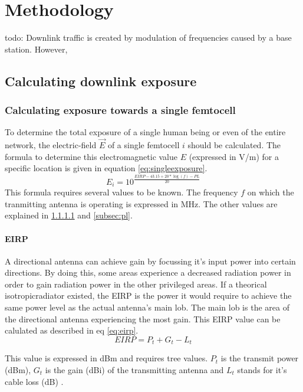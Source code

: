 \chapter{Methodology}
\label{chap:deploymenttool}
todo: Downlink traffic is created by modulation of frequencies caused by a base station. However, 
 
\section{Calculating downlink exposure}
\subsection{Calculating exposure towards a single femtocell}
\label{sec:calculatingexposure}
To determine the total exposure of a single human being or even of the entire network, the electric-field $\vec{E}$ of a single femtocell $i$ should be calculated.
The formula to determine this electromagnetic value $E$ (expressed in V/m) for a specific location is given in equation \ref{eq:singleexposure}.
\begin{equation}
E_i = 10^{\frac{EIRP - 43.15 + 20*\log(f)- PL}{20}}
\label{eq:singleexposure}
\end{equation}
This formula requires several values to be known. The frequency $f$ on which the tranmitting antenna is operating is expressed in MHz. The other values are explained in \ref{subsec:eirp} and \ref{subsec:pl}.

\subsubsection{EIRP}
\label{subsec:eirp}
A directional antenna can achieve gain by focussing it's input power into certain directions. By doing this, some areas experience a decreased radiation power in order to gain radiation power 
in the other privileged areas. If a theorical \gls{isotropicradiator} existed, the \gls{EIRP} is the power it would require to achieve the same power level as the actual antenna's main lob. The main lob is the area of the directional antenna experiencing the most gain.
This \gls{EIRP} value can be calulated as described in eq \ref{eq:eirp}.
\begin{equation}
EIRP = P_t + G_t - L_t
\label{eq:eirp}
\end{equation}

This value is expressed in dBm and requires tree values. $P_t$ is the transmit power (dBm), $G_t$ is the gain (dBi) of the transmitting antenna and $L_t$ stands for it's cable loss (dB) \cite{howToCalculateEIRP}.

